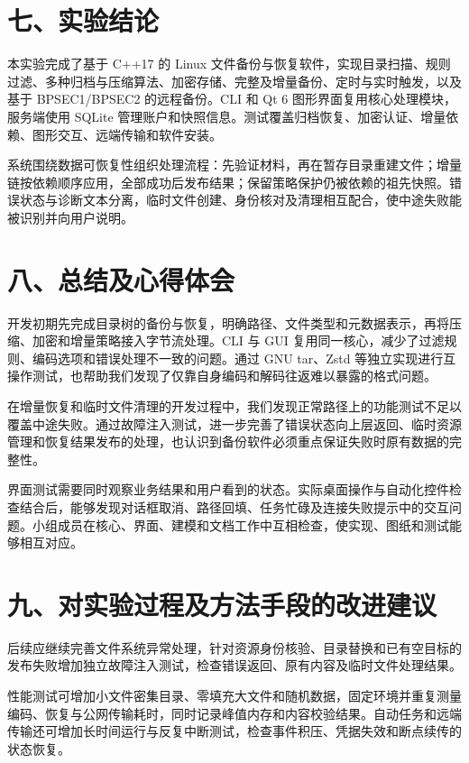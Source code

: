 \section*{七、实验结论}
本实验完成了基于 C++17 的 Linux 文件备份与恢复软件，实现目录扫描、规则过滤、多种归档与压缩算法、加密存储、完整及增量备份、定时与实时触发，以及基于 BPSEC1/BPSEC2 的远程备份。CLI 和 Qt 6 图形界面复用核心处理模块，服务端使用 SQLite 管理账户和快照信息。测试覆盖归档恢复、加密认证、增量依赖、图形交互、远端传输和软件安装。

系统围绕数据可恢复性组织处理流程：先验证材料，再在暂存目录重建文件；增量链按依赖顺序应用，全部成功后发布结果；保留策略保护仍被依赖的祖先快照。错误状态与诊断文本分离，临时文件创建、身份核对及清理相互配合，使中途失败能被识别并向用户说明。

\section*{八、总结及心得体会}
开发初期先完成目录树的备份与恢复，明确路径、文件类型和元数据表示，再将压缩、加密和增量策略接入字节流处理。CLI 与 GUI 复用同一核心，减少了过滤规则、编码选项和错误处理不一致的问题。通过 GNU tar、Zstd 等独立实现进行互操作测试，也帮助我们发现了仅靠自身编码和解码往返难以暴露的格式问题。

在增量恢复和临时文件清理的开发过程中，我们发现正常路径上的功能测试不足以覆盖中途失败。通过故障注入测试，进一步完善了错误状态向上层返回、临时资源管理和恢复结果发布的处理，也认识到备份软件必须重点保证失败时原有数据的完整性。

界面测试需要同时观察业务结果和用户看到的状态。实际桌面操作与自动化控件检查结合后，能够发现对话框取消、路径回填、任务忙碌及连接失败提示中的交互问题。小组成员在核心、界面、建模和文档工作中互相检查，使实现、图纸和测试能够相互对应。

\section*{九、对实验过程及方法手段的改进建议}
后续应继续完善文件系统异常处理，针对资源身份核验、目录替换和已有空目标的发布失败增加独立故障注入测试，检查错误返回、原有内容及临时文件处理结果。

性能测试可增加小文件密集目录、零填充大文件和随机数据，固定环境并重复测量编码、恢复与公网传输耗时，同时记录峰值内存和内容校验结果。自动任务和远端传输还可增加长时间运行与反复中断测试，检查事件积压、凭据失效和断点续传的状态恢复。
